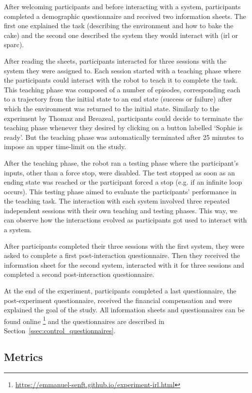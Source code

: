 After welcoming participants and before interacting with a system, participants completed a demographic questionnaire and received two information sheets. The first one explained the task (describing the environment and how to bake the cake) and the second one described the system they would interact with (\gls{irl} or \gls{sparc}). 

After reading the sheets, participants interacted for three sessions with the system they were assigned to. Each session started with a teaching phase where the participants could interact with the robot to teach it to complete the task. This teaching phase was composed of a number of episodes, corresponding each to a trajectory from the initial state to an end state (success or failure) after which the environment was returned to the initial state. Similarly to the experiment by Thomaz and Breazeal, participants could decide to terminate the teaching phase whenever they desired by clicking on a button labelled `Sophie is ready'. But the teaching phase was automatically terminated after 25 minutes to impose an upper time-limit on the study. 

After the teaching phase, the robot ran a testing phase where the participant's inputs, other than a force stop, were disabled. The test stopped as soon as an ending state was reached or the participant forced a stop (e.g. if an infinite loop occurs). This testing phase aimed to evaluate the participants' performance in the teaching task. The interaction with each system involved three repeated independent sessions with their own teaching and testing phases. This way, we can observe how the interactions evolved as participants got used to interact with a system.

After participants completed their three sessions with the first system, they were asked to complete a first post-interaction questionnaire. Then they received the information sheet for the second system, interacted with it for three sessions and completed a second post-interaction questionnaire.

At the end of the experiment, participants completed a last questionnaire, the post-experiment questionnaire, received the financial compensation and were explained the goal of the study. All information sheets and questionnaires can be found online \footnote{\url{https://emmanuel-senft.github.io/experiment-irl.html}} and the questionnaires are described in Section~\ref{ssec:control_questionnaires}.

\subsection{Metrics}

